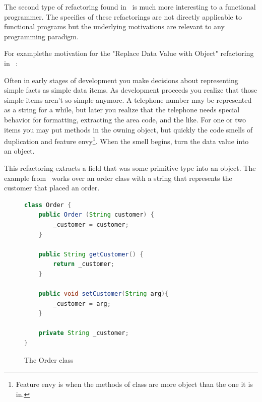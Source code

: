 The second type of refactoring found in~\citep{fowler} is much more interesting to a functional programmer. The specifics of these refactorings are not directly applicable to functional programs but the underlying motivations are relevant to any programming paradigm. 

For example\DIFdelbegin {}\DIFdelend \DIFaddbegin \DIFadd{, }\DIFaddend the motivation for the "Replace Data Value with Object" refactoring in~\citep[pg. 175]{fowler} \DIFaddbegin {}\DIFaddend :

\begin{displayquote}
Often in early stages of development you make decisions about representing simple facts as simple data items. As development proceeds you realize that those simple items aren't so simple anymore. A telephone number may be represented as a string for a while, but later you realize that the telephone needs special behavior for formatting, extracting the area code, and the like. For one or two items you may put methods in the owning object, but quickly the code smells of duplication and feature envy\footnote{Feature envy is when the methods of \DIFdelbegin {}\DIFdelend \DIFaddbegin {}\DIFaddend class are more \DIFdelbegin {}\DIFdelend \DIFaddbegin {}\DIFaddend object than the one it is in. \DIFaddbegin {}\DIFaddend }. When the smell begins, turn the data value into an object.
\end{displayquote}

This refactoring extracts a field that was some primitive type into an object. The example from~\citep{fowler} works over an order class with a string that represents the customer that placed an order.

\begin{figure}[t]
\begin{lstlisting}[language = java,tabsize=4]
class Order {
	public Order (String customer) {
		_customer = customer;	
	}

	public String getCustomer() {
		return _customer;
	}

	public void setCustomer(String arg){
		_customer = arg;	
	}

	private String _customer;
}
\end{lstlisting}
\caption{The Order class}
\end{figure}

